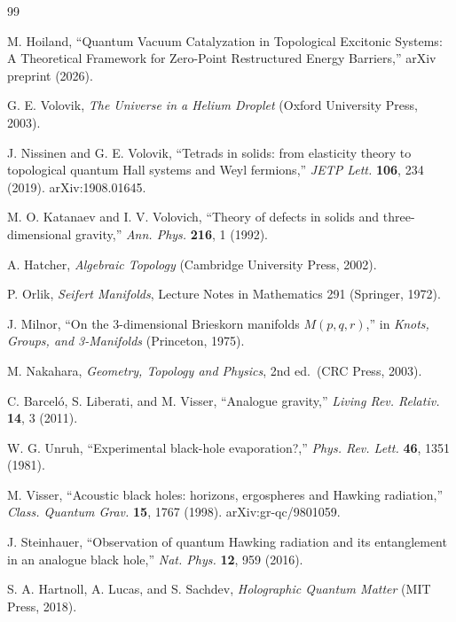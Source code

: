 \documentclass[11pt,letterpaper]{article}
\begin{document}
\begin{thebibliography}{99}

M. Hoiland, ``Quantum Vacuum Catalyzation in Topological Excitonic Systems: A Theoretical Framework for Zero-Point Restructured Energy Barriers,'' arXiv preprint (2026).

G. E. Volovik, \textit{The Universe in a Helium Droplet} (Oxford University Press, 2003).

J. Nissinen and G. E. Volovik, ``Tetrads in solids: from elasticity theory to topological quantum Hall systems and Weyl fermions,'' \textit{JETP Lett.} \textbf{106}, 234 (2019). arXiv:1908.01645.

M. O. Katanaev and I. V. Volovich, ``Theory of defects in solids and three-dimensional gravity,'' \textit{Ann. Phys.} \textbf{216}, 1 (1992).

A. Hatcher, \textit{Algebraic Topology} (Cambridge University Press, 2002).

P. Orlik, \textit{Seifert Manifolds}, Lecture Notes in Mathematics 291 (Springer, 1972).

J. Milnor, ``On the 3-dimensional Brieskorn manifolds $M(p,q,r)$,'' in \textit{Knots, Groups, and 3-Manifolds} (Princeton, 1975).

M. Nakahara, \textit{Geometry, Topology and Physics}, 2nd ed.\ (CRC Press, 2003).

C. Barceló, S. Liberati, and M. Visser, ``Analogue gravity,'' \textit{Living Rev. Relativ.} \textbf{14}, 3 (2011).

W. G. Unruh, ``Experimental black-hole evaporation?,'' \textit{Phys. Rev. Lett.} \textbf{46}, 1351 (1981).

M. Visser, ``Acoustic black holes: horizons, ergospheres and Hawking radiation,'' \textit{Class. Quantum Grav.} \textbf{15}, 1767 (1998). arXiv:gr-qc/9801059.

J. Steinhauer, ``Observation of quantum Hawking radiation and its entanglement in an analogue black hole,'' \textit{Nat. Phys.} \textbf{12}, 959 (2016).

S. A. Hartnoll, A. Lucas, and S. Sachdev, \textit{Holographic Quantum Matter} (MIT Press, 2018).


\end{thebibliography}
\end{document}
